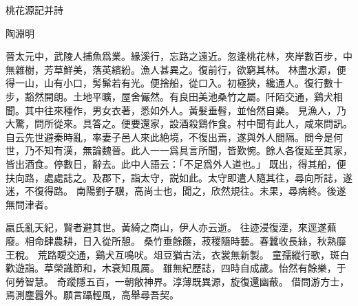 桃花源記并詩

陶淵明

晉太元中，武陵人捕魚爲業。緣溪行，忘路之遠近。忽逢桃花林，夾岸數百步，中無雜樹，芳草鮮美，落英繽紛。漁人甚異之。復前行，欲窮其林。 林盡水源，便得一山，山有小口，髣髴若有光。便捨船，從口入。初極狹，纔通人。復行數十步，豁然開朗。土地平曠，屋舍儼然。有良田美池桑竹之屬。阡陌交通，鷄犬相聞。其中往來種作，男女衣著，悉如外人。黃髮垂髫，並怡然自樂。 見漁人，乃大驚，問所從來。具答之。便要還家，設酒殺鷄作食。村中聞有此人，咸來問訊。自云先世避秦時亂，率妻子邑人來此絶境，不復出焉，遂與外人間隔。問今是何世，乃不知有漢，無論魏晉。此人一一爲具言所聞，皆歎惋。餘人各復延至其家，皆出酒食。停數日，辭去。此中人語云：「不足爲外人道也。」 既出，得其船，便扶向路，處處誌之。及郡下，詣太守，説如此。太守即遣人隨其往，尋向所誌，遂迷，不復得路。 南陽劉子驥，高尚士也，聞之，欣然規往。未果，尋病終。後遂無問津者。

嬴氏亂天紀，賢者避其世。黃綺之商山，伊人亦云逝。
往迹浸復湮，來逕遂蕪廢。相命肆農耕，日入從所憩。
桑竹垂餘蔭，菽稷隨時藝。春蠶收長絲，秋熟靡王稅。
荒路曖交通，鷄犬互鳴吠。俎豆猶古法，衣裳無新製。
童孺縱行歌，斑白歡遊詣。草榮識節和，木衰知風厲。
雖無紀歷誌，四時自成歲。怡然有餘樂，于何勞智慧。
奇蹤隱五百，一朝敞神界。淳薄既異源，旋復還幽蔽。
借問游方士，焉測塵囂外。願言躡輕風，高舉尋吾契。